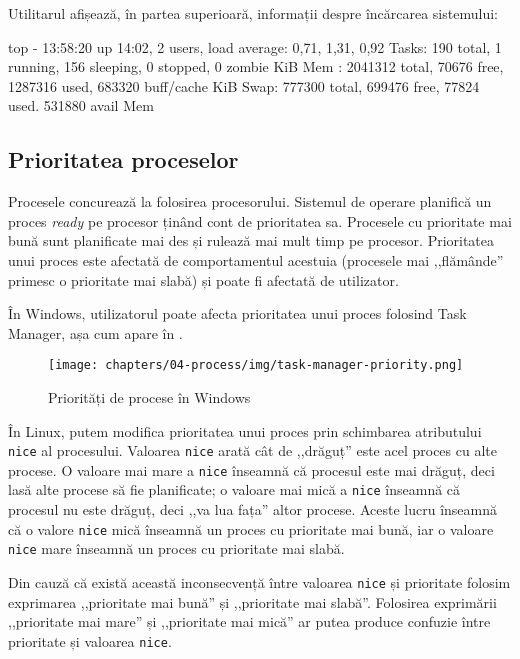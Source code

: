 Utilitarul  afișează, în partea superioară, informații despre încărcarea
sistemului:

\begin{screen}
top - 13:58:20 up 14:02,  2 users,  load average: 0,71, 1,31, 0,92
Tasks: 190 total,   1 running, 156 sleeping,   0 stopped,   0 zombie
KiB Mem :  2041312 total,    70676 free,  1287316 used,   683320 buff/cache
KiB Swap:   777300 total,   699476 free,    77824 used.   531880 avail Mem
\end{screen}

\subsection{Prioritatea proceselor}
\label{sec:process:priority}

Procesele concurează la folosirea procesorului. Sistemul de operare planifică un
proces \textit{ready} pe procesor ținând cont de prioritatea sa. Procesele cu prioritate
mai bună sunt planificate mai des și rulează mai mult timp pe procesor.
Prioritatea unui proces este afectată de comportamentul acestuia (procesele mai
,,flămânde'' primesc o prioritate mai slabă) și poate fi afectată de utilizator.

În Windows, utilizatorul poate afecta prioritatea unui proces folosind Task Manager, așa cum apare în .

\begin{figure}[!htbp]
	\centering
	\texttt{[image: chapters/04-process/img/task-manager-priority.png]}
	\caption{Priorități de procese în Windows}
	\label{fig:process:priority-task-manager}
\end{figure}

În Linux, putem modifica prioritatea unui proces prin schimbarea atributului \texttt{nice} al procesului.
Valoarea \texttt{nice} arată cât de ,,drăguț'' este acel proces cu alte
procese. O valoare mai mare a \texttt{nice} înseamnă că procesul este mai drăguț, deci
lasă alte procese să fie planificate; o valoare mai mică a \texttt{nice} înseamnă că
procesul nu este drăguț, deci ,,va lua fața'' altor procese. Aceste lucru înseamnă
că o valore \texttt{nice} mică înseamnă un proces cu prioritate mai bună, iar o valoare
\texttt{nice} mare înseamnă un proces cu prioritate mai slabă.

\begin{note}
Din cauză că există această inconsecvență între valoarea \texttt{nice} și prioritate
folosim exprimarea ,,prioritate mai bună'' și ,,prioritate mai slabă''.
Folosirea exprimării ,,prioritate mai mare'' și ,,prioritate mai mică'' ar
putea produce confuzie între prioritate și valoarea \texttt{nice}.
\end{note}

